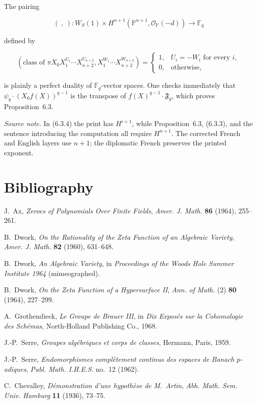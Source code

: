 The pairing

\begin{equation}\tag{6.3.6}
(\ ,\ ):
W_S(1)\times
H^{n+1}(\mathbb P^{n+1},\mathcal O_{\mathbb P}(-d))
\longrightarrow\mathbb F_q
\end{equation}

defined by

\begin{equation}\tag{6.3.7}
\left(
\text{class of }\pi X_0X_1^{U_1}\cdots X_{n+2}^{U_{n+2}},
X_1^{W_1}\cdots X_{n+2}^{W_{n+2}}
\right)
=
\begin{cases}
1,&U_i=-W_i\text{ for every }i,\\
0,&\text{otherwise},
\end{cases}
\end{equation}

is plainly a perfect duality of $\mathbb F_q$-vector spaces.  One checks
immediately that
$\psi_q\cdot(X_0f(X))^{q-1}$ is the transpose of
$f(X)^{q-1}\cdot \mathfrak F_q$, which proves Proposition~6.3.

\medskip
\noindent\emph{Source note.}
In (6.3.4) the print has $H^{i+1}$, while Proposition~6.3, (6.3.3), and the
sentence introducing the computation all require $H^{n+1}$.  The corrected
French and English layers use $n+1$; the diplomatic French preserves the
printed exponent.

\section*{Bibliography}

\begin{enumerate}[label={[\arabic*]},leftmargin=2.4em]
\item J.~Ax, \emph{Zeroes of Polynomials Over Finite Fields},
  \emph{Amer. J. Math.} \textbf{86} (1964), 255--261.
\item B.~Dwork, \emph{On the Rationality of the Zeta Function of an Algebraic
  Variety}, \emph{Amer. J. Math.} \textbf{82} (1960), 631--648.
\item B.~Dwork, \emph{An Algebraic Variety}, in \emph{Proceedings of the
  Woods Hole Summer Institute 1964} (mimeographed).
\item B.~Dwork, \emph{On the Zeta Function of a Hypersurface II},
  \emph{Ann. of Math.} (2) \textbf{80} (1964), 227--299.
\item A.~Grothendieck, \emph{Le Groupe de Brauer III}, in
  \emph{Dix Exposés sur la Cohomologie des Schémas},
  North-Holland Publishing Co., 1968.
\item J.-P.~Serre, \emph{Groupes algébriques et corps de classes},
  Hermann, Paris, 1959.
\item J.-P.~Serre, \emph{Endomorphismes complètement continus des espaces de
  Banach $p$-adiques}, \emph{Publ. Math. I.H.E.S.} no.~12 (1962).
\item C.~Chevalley, \emph{Démonstration d'une hypothèse de M.~Artin},
  \emph{Abh. Math. Sem. Univ. Hamburg} \textbf{11} (1936), 73--75.
\end{enumerate}
